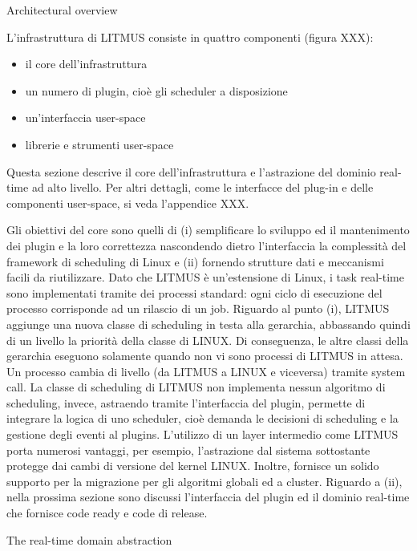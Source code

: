 Architectural overview

L'infrastruttura di LITMUS consiste in quattro componenti (figura XXX):

\begin{itemize}
\item il core dell'infrastruttura
\item un numero di plugin, cioè gli scheduler a disposizione
\item un'interfaccia user-space
\item librerie e strumenti user-space
\end{itemize}


Questa sezione descrive il core dell'infrastruttura e l'astrazione del dominio real-time ad alto livello. Per altri dettagli, come le interfacce del plug-in e delle componenti user-space, si veda l'appendice XXX.

Gli obiettivi del core sono quelli di (i) semplificare lo sviluppo ed il mantenimento dei plugin e la loro correttezza nascondendo dietro l'interfaccia la complessità del framework di scheduling di Linux e (ii) fornendo strutture dati e meccanismi facili da riutilizzare. Dato che LITMUS è un'estensione di Linux, i task real-time sono implementati tramite dei processi standard: ogni ciclo di esecuzione del processo corrisponde ad un rilascio di un job. 
Riguardo al punto (i), LITMUS aggiunge una nuova classe di scheduling in testa alla gerarchia, abbassando quindi di un livello la priorità della classe di LINUX. Di conseguenza, le altre classi della gerarchia eseguono solamente quando non vi sono processi di LITMUS in attesa. Un processo cambia di livello (da LITMUS a LINUX e viceversa) tramite system call.
La classe di scheduling di LITMUS non implementa nessun algoritmo di scheduling, invece, astraendo tramite l'interfaccia del plugin, permette di integrare la logica di uno scheduler, cioè demanda le decisioni di scheduling e la gestione degli eventi al plugins.
L'utilizzo di un layer intermedio come LITMUS porta numerosi vantaggi, per esempio, l'astrazione dal sistema sottostante protegge dai cambi di versione del kernel LINUX. Inoltre, fornisce un solido supporto per la migrazione per gli algoritmi globali ed a cluster.
Riguardo a (ii), nella prossima sezione sono discussi l'interfaccia del plugin ed il dominio real-time che fornisce code ready e code di release.

The real-time domain abstraction

